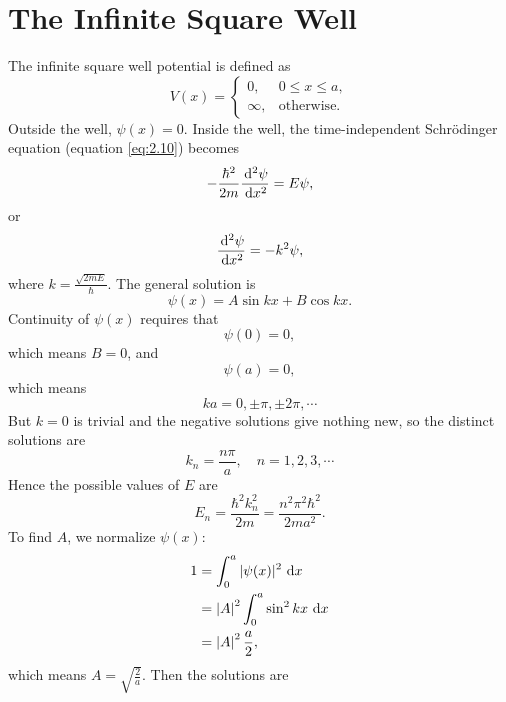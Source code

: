 \documentclass[en, oneside]{vivi}
\begin{document}
\section{The Infinite Square Well}
The infinite square well potential is defined as
\begin{equation}
    V(x) = \begin{cases}
        0, & 0 \leq x \leq a,\\
        \infty, & \text{otherwise}.
    \end{cases}
\end{equation}
Outside the well, $\psi(x) = 0$. Inside the well, the time-independent Schrödinger equation (equation \eqref{eq:2.10}) becomes
\begin{equation}
    -\frac{\hbar^2}{2m} \frac{\dif[2] \psi}{\dif x^2} = E\psi,
\end{equation}
or
\begin{equation}
    \frac{\dif[2] \psi}{\dif x^2} = -k^2 \psi,
\end{equation}
where $k = \frac{\sqrt{2mE}}{\hbar}$. The general solution is
\begin{equation}
    \psi(x) = A \sin kx + B \cos kx.
\end{equation}
Continuity of $\psi(x)$ requires that
\begin{equation}
    \psi(0) = 0,
\end{equation}
which means $B = 0$, and
\begin{equation}
    \psi(a) = 0,
\end{equation}
which means
\begin{equation}
    k a = 0, \pm \pi, \pm 2\pi, \cdots
\end{equation}
But $k = 0$ is trivial and the negative solutions give nothing new, so the distinct solutions are
\begin{equation}
    k_n = \frac{n\pi}{a}, \quad n = 1, 2, 3, \cdots
\end{equation}
Hence the possible values of $E$ are
\begin{equation}
    \boxed{
        E_n = \frac{\hbar^2 k_n^2}{2m} = \frac{n^2 \pi^2 \hbar^2}{2m a^2}.
    }
\end{equation}
To find $A$, we normalize $\psi(x)$:
\begin{align}
    1 &= \int_0^a |\psi(x)|^2 \dif x\\
    &= \abs{A}^2\int_0^a \sin^2 kx \dif x\\
    &= \abs{A}^2 \frac{a}{2},
\end{align}
which means $A = \sqrt{\frac{2}{a}}$. Then the solutions are
\end{document}

